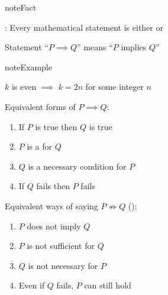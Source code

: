 \documentclass[letterpaper,10pt,english]{jupyterBook}
\begin{document}
\begin{sphinxadmonition}{note}{Fact}

\sphinxAtStartPar
{}: Every mathematical statement is either  or 
\end{sphinxadmonition}

\sphinxAtStartPar
Statement “\(P \implies Q\)” means “\(P\) implies \(Q\)”

\begin{sphinxadmonition}{note}{Example}

\sphinxAtStartPar
\(k\) is even \(\implies\) \(k = 2n\) for some integer \(n\)
\end{sphinxadmonition}

\sphinxAtStartPar
Equivalent forms of \(P \implies Q\):
\begin{enumerate}
%
\item {} 
\sphinxAtStartPar
If \(P\) is true then \(Q\) is true

\item {} 
\sphinxAtStartPar
\(P\) is a  for \(Q\)

\item {} 
\sphinxAtStartPar
\(Q\) is a necessary condition for \(P\)

\item {} 
\sphinxAtStartPar
If \(Q\) fails then \(P\) fails

\end{enumerate}

\begin{figure}[htbp]
\centering

\noindent{}
\end{figure}

\sphinxAtStartPar
Equivalent ways of saying \(P \nRightarrow Q\) ():
\begin{enumerate}
%
\item {} 
\sphinxAtStartPar
\(P\) does not imply \(Q\)

\item {} 
\sphinxAtStartPar
\(P\) is not sufficient for \(Q\)

\item {} 
\sphinxAtStartPar
\(Q\) is not necessary for \(P\)

\item {} 
\sphinxAtStartPar
Even if \(Q\) fails, \(P\) can still hold

\end{enumerate}
\end{document}
